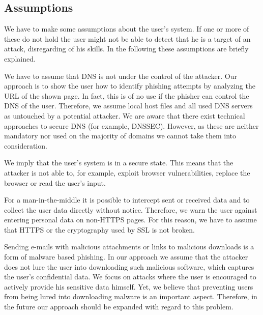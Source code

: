 \subsection{Assumptions}
\label{s:assumptions}
We have to make some assumptions about the user's system. 
If one or more of these do not hold the user might not be able to detect that he is a target of an attack, disregarding of his skills.
In the following these assumptions are briefly explained.
\begin{description}[leftmargin=0cm]
	\item[Secure DNS:] We have to assume that DNS is not under the control of the attacker.
	Our approach is to show the user how to identify phishing attempts by analyzing the URL of the shown page.
	In fact, this is of no use if the phisher can control the DNS of the user.
	Therefore, we assume local host files and all used DNS servers as untouched by a potential attacker.
	We are aware that there exist technical approaches to secure DNS (for example, DNSSEC). However, as these are neither mandatory nor used on the majority of domains we cannot take them into consideration.
	\item[Secure Smartphone:] We imply that the user's system is in a secure state.
	This means that the attacker is not able to, for example, exploit browser vulnerabilities, replace the browser or read the user's input.
	\item[Secure SSL:] 
	For a man-in-the-middle it is possible to intercept sent or received data and to collect the user data directly without notice.
	Therefore, we warn the user against entering personal data on non-HTTPS pages.
	For this reason, we have to assume that HTTPS or the cryptography used by SSL is not broken.
\item[No Malware:] 
	Sending e-mails with malicious attachments or links to malicious downloads is a form of malware based phishing.
	In our approach we assume that the attacker does not lure the user into downloading such malicious software, which captures the user's confidential data.
	We focus on attacks where the user is encouraged to actively provide his sensitive data himself.
	Yet, we believe that preventing users from being lured into downloading malware is an important aspect.
	Therefore, in the future our approach should be expanded with regard to this problem.
\end{description}

